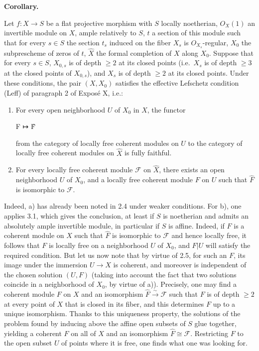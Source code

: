\documentclass[
]{article}
\newenvironment{Shaded}{}{}
\newcommand{\NormalTok}[1]{#1}
\begin{document}
\textbf{Corollary.}

Let \(f: X \to S\) be a flat projective morphism with \(S\) locally
noetherian, \(O_{X}(1)\) an invertible module on \(X\), ample relatively
to \(S\), \(t\) a section of this module such that for every \(s \in S\)
the section \(t_{s}\) induced on the fiber \(X_{s}\) is
\(O_{X_{s}}\)-regular, \(X_{0}\) the subprescheme of zeros of \(t\),
\(\hat{X}\) the formal completion of \(X\) along \(X_{0}\). Suppose that
for every \(s \in S\), \(X_{0,s}\) is of depth \(\geqslant 2\) at its
closed points (i.e.~\(X_{s}\) is of depth \(\geqslant 3\) at the closed
points of \(X_{0,s}\)), and \(X_{s}\) is of depth \(\geqslant 2\) at its
closed points. Under these conditions, the pair \((X, X_{0})\) satisfies
the effective Lefschetz condition (Leff) of paragraph 2 of Exposé X,
i.e.:

\begin{enumerate}
\def\labelenumi{\arabic{enumi}.}
\item
  For every open neighborhood \(U\) of \(X_{0}\) in \(X\), the functor

\begin{Shaded}
\begin{Highlighting}[]
\NormalTok{F ↦ F̂}
\end{Highlighting}
\end{Shaded}

  from the category of locally free coherent modules on \(U\) to the
  category of locally free coherent modules on \(\hat{X}\) is fully
  faithful.
\item
  For every locally free coherent module \(\mathcal{F}\) on \(\hat{X}\),
  there exists an open neighborhood \(U\) of \(X_{0}\), and a locally
  free coherent module \(F\) on \(U\) such that \(\hat{F}\) is
  isomorphic to \(\mathcal{F}\).
\end{enumerate}

Indeed, a) has already been noted in 2.4 under weaker conditions. For
b), one applies 3.1, which gives the conclusion, at least if \(S\) is
noetherian and admits an absolutely ample invertible module, in
particular if \(S\) is affine. Indeed, if \(F\) is a coherent module on
\(X\) such that \(\hat{F}\) is isomorphic to \(\mathcal{F}\) and hence
locally free, it follows that \(F\) is locally free on a neighborhood
\(U\) of \(X_{0}\), and \(F|U\) will satisfy the required condition. But
let us now note that by virtue of 2.5, for such an \(F\), its image
under the immersion \(U \to X\) is coherent, and moreover is independent
of the chosen solution \((U, F)\) (taking into account the fact that two
solutions coincide in a neighborhood of \(X_{0}\), by virtue of a)).
Precisely, one may find a coherent module \(F\) on \(X\) and an
isomorphism \(\hat{F} \xrightarrow{\sim} \mathcal{F}\) such that \(F\)
is of depth \(\geqslant 2\) at every point of \(X\) that is closed in
its fiber, and this determines \(F\) up to a unique isomorphism. Thanks
to this uniqueness property, the solutions of the problem found by
inducing above the affine open subsets of \(S\) glue together, yielding
a coherent \(F\) on all of \(X\) and an isomorphism
\(\hat{F} \cong \mathcal{F}\). Restricting \(F\) to the open subset
\(U\) of points where it is free, one finds what one was looking for.
\end{document}

